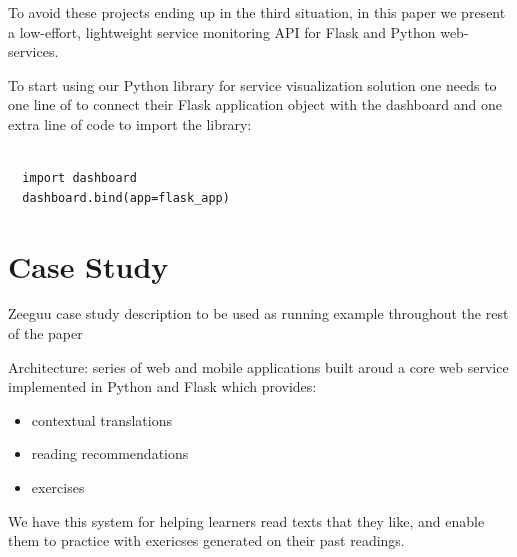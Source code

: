 \documentclass[conference]{IEEEtran}
\begin{document}
To avoid these projects ending up in the third situation, in this paper we present a low-effort, lightweight service monitoring API for Flask and Python web-services.

To start using our Python library for service visualization solution one needs to one line of to connect their Flask application object with the dashboard and one extra line of code to import the library:

\begin{lstlisting}[caption=Configuring the \tool is straightforward,style=custompython]

  import dashboard
  dashboard.bind(app=flask_app)

\end{lstlisting}





\section{Case Study}

Zeeguu case study description to be used as running example throughout the rest of the paper \cite{Lungu16}

Architecture: series of web and mobile applications built aroud a core web service implemented in Python and Flask which provides: 
\begin{itemize}
  \item contextual translations 
  \item reading recommendations
  \item exercises
\end{itemize}

We have this system for helping learners read texts that they like, and enable them to practice with exericses generated on their past readings.

\end{document}
